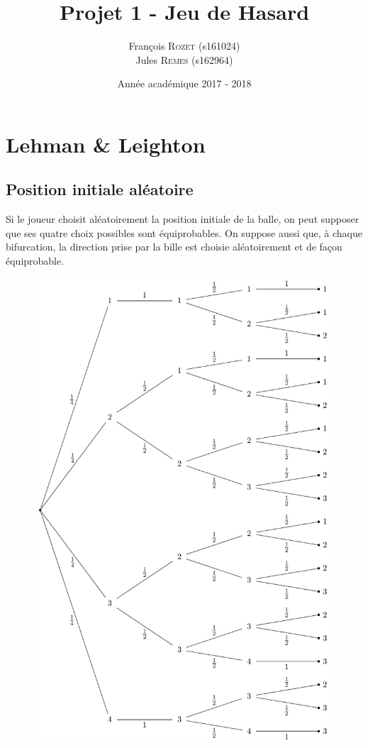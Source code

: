 \documentclass[a4paper, 12pt]{article}
\title{Projet 1 - Jeu de Hasard}
\author{François \textsc{Rozet} (s161024)\\Jules \textsc{Remes} (s162964)\\}
\date{Année académique 2017 - 2018}
\begin{document}
	
	\newpage
	\section{Lehman \& Leighton}
	\subsection{Position initiale aléatoire}
	Si le joueur choisit aléatoirement la position initiale de la balle, on peut supposer que ses quatre choix possibles sont équiprobables. On suppose aussi que, à chaque bifurcation, la direction prise par la bille est choisie aléatoirement et de façon équiprobable.
	\begin{figure}[H]
		\centering
		\includegraphics[scale = 0.95]{resources/tikz/lehman_leighton_full/lehman_leighton_full.pdf}
		\label{figure: Q1a}
	\end{figure}
\end{document}
